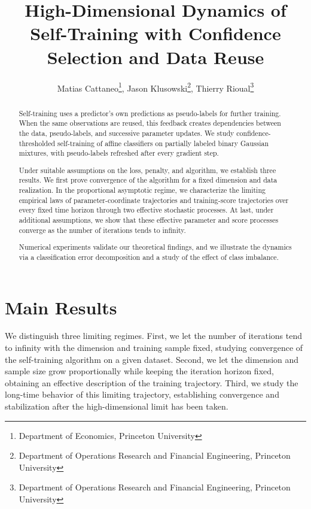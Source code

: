 \documentclass{article}
\title{High-Dimensional Dynamics of Self-Training with Confidence Selection and Data Reuse}
\author{
    Matias Cattaneo\thanks{Department of Economics, Princeton University},
    Jason Klusowski\thanks{Department of Operations Research and Financial Engineering, Princeton University},
    Thierry Rioual\thanks{Department of Operations Research and Financial Engineering, Princeton University}
}
\theoremstyle{plain}
\theoremstyle{definition}
\theoremstyle{remark}
\newcommand{\1}{\mathbf{1}}   %
\begin{document}
\maketitle

\begin{abstract}
Self-training uses a predictor's own predictions as pseudo-labels
for further training. When the same observations are reused,
this feedback creates dependencies between the data, pseudo-labels,
and successive parameter updates.
We study confidence-thresholded self-training of affine classifiers
on partially labeled binary Gaussian mixtures, with pseudo-labels
refreshed after every gradient step.

Under suitable assumptions on the loss, penalty, and algorithm,
we establish three results.
We first prove convergence of the algorithm for a fixed dimension
and data realization.
In the proportional asymptotic regime, we characterize the
limiting empirical laws of parameter-coordinate trajectories
and training-score trajectories over every fixed time horizon
through two effective stochastic processes.
At last, under additional assumptions, we show that these effective 
parameter and score processes converge as the number of iterations 
tends to infinity.

Numerical experiments validate our theoretical findings, and we illustrate 
the dynamics via a classification error decomposition and 
a study of the effect of class imbalance.
\end{abstract}

\tableofcontents





\section{Main Results}
\label{sec:main-result}

We distinguish three limiting regimes. First, we let the number of iterations tend to infinity with the dimension and training sample fixed, studying convergence of the self-training algorithm on a given dataset. Second, we let the dimension and sample size grow proportionally while keeping the iteration horizon fixed, obtaining an effective description of the training trajectory. Third, we study the long-time behavior of this limiting trajectory, establishing convergence and stabilization after the high-dimensional limit has been taken. 










\appendix








\end{document}
